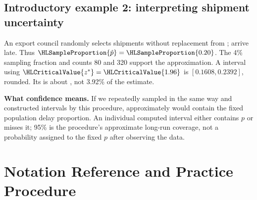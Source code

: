 \subsection{Introductory example 2: interpreting shipment uncertainty}\label{ex:intro-two}
An export council randomly selects  shipments without replacement from ;  arrive late. Thus $\HLSampleProportion{\hat p}=\HLSampleProportion{0.20}$. The 4\% sampling fraction and counts 80 and 320 support the approximation. A  interval using $\HLCriticalValue{z^*}=\HLCriticalValue{1.96}$ is $[0.1608,0.2392]$, rounded. Its  is about , not 3.92\% of the estimate.

\textbf{What confidence means.} If we repeatedly sampled in the same way and constructed intervals by this procedure, approximately  would contain the fixed population delay proportion. An individual computed interval either contains $p$ or misses it; 95\% is the procedure's approximate long-run coverage, not a probability assigned to the fixed $p$ after observing the data.
\clearpage

\section{Notation Reference and Practice Procedure}\label{sec:notation-and-procedure}
